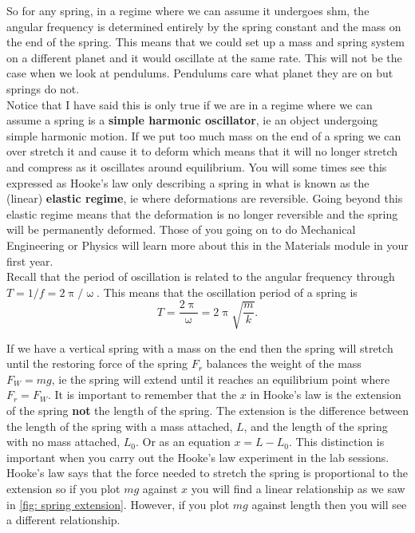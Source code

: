 So for any spring, in a regime where we can assume it undergoes shm, the angular frequency is determined entirely by the spring constant and the mass on the end of the spring. This means that we could set up a mass and spring system on a different planet and it would oscillate at the same rate. This will not be the case when we look at pendulums. Pendulums care what planet they are on but springs do not.\\

Notice that I have said this is only true if we are in a regime where we can assume a spring is a \textbf{simple harmonic oscillator}, ie an object undergoing simple harmonic motion. If we put too much mass on the end of a spring we can over stretch it and cause it to deform which means that it will no longer stretch and compress as it oscillates around equilibrium. You will some times see this expressed as Hooke's law only describing a spring in what is known as the (linear) \textbf{elastic regime}, ie where deformations are reversible. Going beyond this elastic regime means that the deformation is no longer reversible and the spring will be permanently deformed. Those of you going on to do Mechanical Engineering or Physics will learn more about this in the Materials module in your first year.\\

Recall that the period of oscillation is related to the angular frequency through $T=1/f=2\uppi/\upomega$. This means that the oscillation period of a spring is
\begin{equation}
T=\frac{2\uppi}{\upomega}=2\uppi\sqrt{\frac{m}{k}}.
\label{eq: spring period}
\end{equation}

If we have a vertical spring with a mass on the end then the spring will stretch until the restoring force of the spring $F_{r}$ balances the weight of the mass $F_{W}=mg$, ie the spring will extend until it reaches an equilibrium point where $F_{r}=F_{W}$. It is important to remember that the $x$ in Hooke's law is the extension of the spring \textbf{not} the length of the spring. The extension is the difference between the length of the spring with a mass attached, $L$, and the length of the spring with no mass attached, $L_{0}$. Or as an equation $x=L-L_{0}$. This distinction is important when you carry out the Hooke's law experiment in the lab sessions. Hooke's law says that the force needed to stretch the spring is proportional to the extension so if you plot $mg$ against $x$ you will find a linear relationship as we saw in \cref{fig: spring extension}. However, if you plot $mg$ against length then you will see a different relationship.

